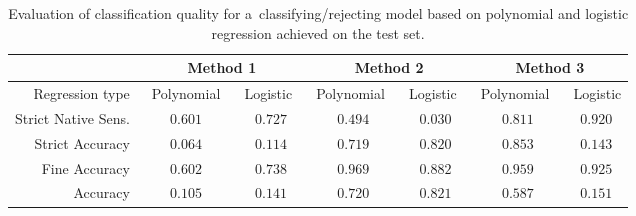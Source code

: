 \documentclass{llncs}
\begin{document}
\begin{table}[!htbp]
	\vspace{-0pt}
	\centering
	\caption{Evaluation of classification quality for a~classifying/rejecting model based on polynomial and logistic regression achieved on the test set. }
	\vspace{-6pt}
	\setlength{\tabcolsep}{5pt}
	\renewcommand{\arraystretch}{1}
	{\footnotesize
		\begin{tabular}{|r||c|c||c|c||c|c|}
			\hline
			& \multicolumn{2}{c||}{Method 1} & \multicolumn{2}{c||}{Method 2} & \multicolumn{2}{c|}{Method 3}\\
			\hline
			Regression type & $\;\;$Polynomial$\;\;$ & $\,$Logistic$\;\;$ & $\,$Polynomial$\;\;$ & $\,$Logistic$\;\;$ & $\,$Polynomial$\;\;$ & $\,$Logistic  \\
			\hline
			Strict Native Sens. & $0.601$ & $0.727$ & $0.494$ & $0.030$ & $0.811$ & $0.920$ \\			
			Strict Accuracy  & $0.064$ & $0.114$ & $0.719$ & $0.820$ & $0.853$ & $0.143$ \\
			Fine Accuracy       & $0.602$ & $0.738$ & $0.969$ & $0.882$ & $0.959$ & $0.925$ \\
			Accuracy  & $0.105$ & $0.141$ & $0.720$ & $0.821$ & $0.587$ & $0.151$ \\			
			\hline			
		\end{tabular}	
	}
	\vspace{-0pt}
	\label{tab:results_classification_regression}
\end{table}
\end{document}
